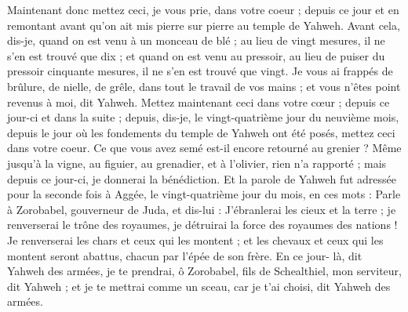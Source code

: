 \begin{multicols}{2}
Maintenant donc mettez ceci, je vous prie, dans votre coeur ; depuis ce jour et en remontant avant qu'on ait mis pierre sur pierre au temple de Yahweh.
Avant cela, dis-je, quand on est venu à un monceau de blé ; au lieu de vingt mesures, il ne s'en est trouvé que dix ; et quand on est venu au pressoir, au lieu de puiser du pressoir cinquante mesures, il ne s'en est trouvé que vingt.
Je vous ai frappés de brûlure, de nielle, de grêle, dans tout le travail de vos mains ; et vous n'êtes point revenus à moi, dit Yahweh.
Mettez maintenant ceci dans votre cœur ; depuis ce jour-ci et dans la suite ; depuis, dis-je, le vingt-quatrième jour du neuvième mois, depuis le jour où les fondements du temple de Yahweh ont été posés, mettez ceci dans votre coeur.
Ce que vous avez semé est-il encore retourné au grenier ? Même jusqu'à la vigne, au figuier, au grenadier, et à l'olivier, rien n'a rapporté ; mais depuis ce jour-ci, je donnerai la bénédiction.
Et la parole de Yahweh fut adressée pour la seconde fois à Aggée, le vingt-quatrième jour du mois, en ces mots :
Parle à Zorobabel, gouverneur de Juda, et dis-lui : J'ébranlerai les cieux et la terre ;
je renverserai le trône des royaumes, je détruirai la force des royaumes des nations ! Je renverserai les chars et ceux qui les montent ; et les chevaux et ceux qui les montent seront abattus, chacun par l'épée de son frère.
En ce jour- là, dit Yahweh des armées, je te prendrai, ô Zorobabel, fils de Schealthiel, mon serviteur, dit Yahweh ; et je te mettrai comme un sceau, car je t'ai choisi, dit Yahweh des armées.
\PPE{}
\end{multicols}
